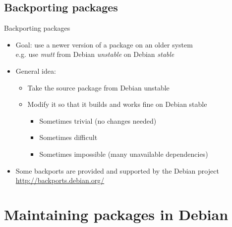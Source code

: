 \documentclass[10pt,final]{beamer}
\begin{document}
\subsection{Backporting packages}
\begin{frame}{Backporting packages}
  \begin{itemize}
  \item Goal: use a newer version of a package on an older system\\
	  e.g. use \textsl{mutt} from Debian \textsl{unstable} on Debian \textsl{stable}
	\br
  \item General idea:
	  \begin{itemize}
		\item Take the source package from Debian unstable
		\hbr
		\item Modify it so that it builds and works fine on Debian stable
		\begin{itemize}
			\item Sometimes trivial (no changes needed)
			\item Sometimes difficult
			\item Sometimes impossible (many unavailable dependencies)
		\end{itemize}
	\end{itemize}
	\br
   \item Some backports are provided and supported by the Debian project\\
	   \url{http://backports.debian.org/}
\end{itemize}
\end{frame}



\section{Maintaining packages in Debian}
\end{document}
